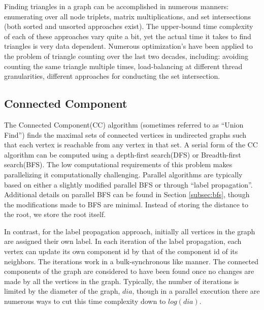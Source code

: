 Finding triangles in a graph can be accomplished in numerous manners: enumerating over all node triplets, matrix multiplications, and set intersections (both sorted and unsorted approaches exist). The upper-bound time complexity of each of these approaches vary quite a bit, yet the actual time it takes to find triangles is very data dependent. Numerous optimization's have been applied to the problem of triangle counting over the last two decades, including: avoiding counting the same triangle multiple times, load-balancing at different thread granularities, different approaches for conducting the set intersection.





\subsection{Connected Component}
The Connected Component(CC) algorithm (sometimes referred to as  ``Union Find'') finds the maximal sets of connected vertices in undirected graphs such that each vertex is reachable from any vertex in that set. A serial form of the CC algorithm can be computed using a depth-first search(DFS) or Breadth-first search(BFS). The low computational requirements of this problem makes parallelizing it computationally challenging. Parallel algorithms are typically based on either a slightly modified parallel BFS or through ``label propagation''. Additional details on parallel BFS can be found in Section \ref{subsec:bfs}, though the modifications made to BFS are minimal. Instead of storing the distance to the root, we store the root itself.

In contrast, for the label propagation approach, initially all vertices in the graph are assigned their own label. In each iteration of the label propagation, each vertex can update its own component id by that of the component id of its neighbors. The iterations work in a bulk-synchronous like manner. The connected components of the graph are considered to have been found once no changes are made by all the vertices in the graph. Typically, the number of iterations is limited by the diameter of the graph, $dia$, though in a parallel execution there are numerous ways to cut this time complexity down to $log(dia)$.

